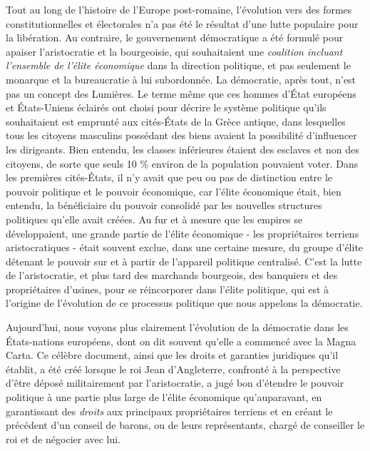 Tout au long de l'histoire de l'Europe post-romaine, l'évolution vers des formes constitutionnelles et électorales n'a pas été le résultat d'une lutte populaire pour la libération. Au contraire, le gouvernement démocratique a été formulé pour apaiser l'aristocratie et la bourgeoisie, qui souhaitaient une \emph{coalition incluant l'ensemble de l'élite économique} dans la direction politique, et pas seulement le monarque et la bureaucratie à lui subordonnée. La démocratie, après tout, n'est pas un concept des Lumières. Le terme même que ces hommes d'État européens et États-Uniens éclairés ont choisi pour décrire le système politique qu'ils souhaitaient est emprunté aux cités-États de la Grèce antique, dans lesquelles tous les citoyens masculins possédant des biens avaient la possibilité d'influencer les dirigeants. Bien entendu, les classes inférieures étaient des esclaves et non des citoyens, de sorte que seuls 10 \% environ de la population pouvaient voter. Dans les premières cités-États, il n'y avait que peu ou pas de distinction entre le pouvoir politique et le pouvoir économique, car l'élite économique était, bien entendu, la bénéficiaire du pouvoir consolidé par les nouvelles structures politiques qu'elle avait créées. Au fur et à mesure que les empires se développaient, une grande partie de l'élite économique - les propriétaires terriens aristocratiques - était souvent exclue, dans une certaine mesure, du groupe d'élite détenant le pouvoir sur et à partir de l'appareil politique centralisé. C'est la lutte de l'aristocratie, et plus tard des marchands bourgeois, des banquiers et des propriétaires d'usines, pour se réincorporer dans l'élite politique, qui est à l'origine de l'évolution de ce processus politique que nous appelons la démocratie.

Aujourd'hui, nous voyons plus clairement l'évolution de la démocratie dans les États-nations européens, dont on dit souvent qu'elle a commencé avec la Magna Carta. Ce célèbre document, ainsi que les droits et garanties juridiques qu'il établit, a été créé lorsque le roi Jean d'Angleterre, confronté à la perspective d'être déposé militairement par l'aristocratie, a jugé bon d'étendre le pouvoir politique à une partie plus large de l'élite économique qu'auparavant, en garantissant des \emph{droits} aux principaux propriétaires terriens et en créant le précédent d'un conseil de barons, ou de leurs représentants, chargé de conseiller le roi et de négocier avec lui.

